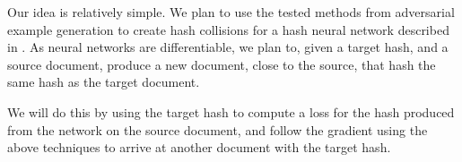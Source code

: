\documentclass{article}
\begin{document}
Our idea is relatively simple. We plan to use the tested methods from adversarial example generation to
create hash collisions for a hash neural network described in \cite{hash1}. As neural networks are 
differentiable, we plan to, given a target hash, and a source document, produce a new document, close 
to the source, that hash the same hash as the target document. 

We will do this by using the target hash to compute a loss for the hash produced from the network on the
source document, and follow the gradient using the above techniques to arrive at another document with the
target hash.

 
\end{document}
